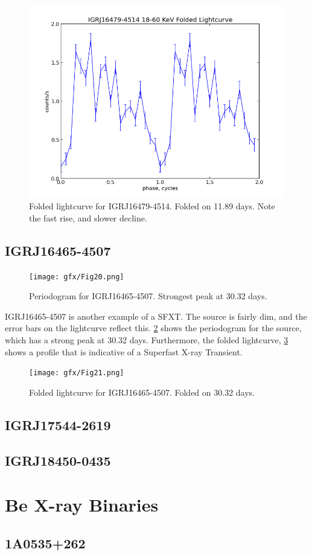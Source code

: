 \begin{figure}[h!]
\centering
\includegraphics[width=130mm]{gfx/Fig19.png}
\caption{Folded lightcurve for IGRJ16479-4514. Folded on 11.89 days. Note the fast rise, and slower decline.}
\label{Figure 19}
\end{figure} 

\subsection{IGRJ16465-4507}

\begin{figure}[h!]
\centering
\texttt{[image: gfx/Fig20.png]}
\caption{Periodogram for IGRJ16465-4507. Strongest peak at 30.32 days.}
\label{Figure 20}
\end{figure} 

IGRJ16465-4507 is another example of a SFXT. The source is fairly dim, and the error bars on the lightcurve reflect this. \ref{Figure 20} shows the periodogram for the source, which has a strong peak at 30.32 days. Furthermore, the folded lightcurve, \ref{Figure 21} shows a profile that is indicative of a Superfast X-ray Transient. 

\begin{figure}[h!]
\centering
\texttt{[image: gfx/Fig21.png]}
\caption{Folded lightcurve for IGRJ16465-4507. Folded on 30.32 days.}
\label{Figure 21}
\end{figure} 

\subsection{IGRJ17544-2619}


\subsection{IGRJ18450-0435}

\clearpage
\section{Be X-ray Binaries}

\subsection{1A0535+262}

\subsection{}

